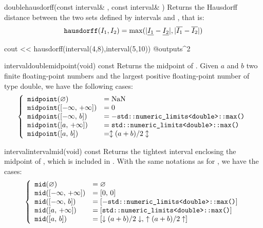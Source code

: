 \documentclass{manual}
\newcommand{\itv}[2]{\ensuremath{[#1,\,#2]}}
\newcommand{\roundDn}[1]{\ensuremath{\downarrow#1\downarrow}}
\newcommand{\roundUp}[1]{\ensuremath{\uparrow#1\uparrow}}
\newcommand{\roundNearest}[1]{\ensuremath{\updownarrow#1\updownarrow}}
\newcommand{\leftBound}[1]{\ensuremath{\underline{#1}}}
\newcommand{\rightBound}[1]{\ensuremath{\overline{#1}}}
\let\emptyset=\varnothing
\begin{document}
\begin{deffun}{double}{hausdorff}{(const interval\& , const interval\& )}
  Returns the Hausdorff distance between the two sets defined by intervals  and
  , that is:
\begin{equation*}
\code{hausdorff}(I_1,I_2)=\max(|\leftBound{I_1}-\leftBound{I_2}|,
                          |\rightBound{I_1}-\rightBound{I_2}|)
\end{equation*}
\begin{example}
cout << hausdorff(interval(4,8),interval(5,10))
@outputs^2~
\end{example}
\end{deffun}

\begin{defmethod}{interval}{double}{midpoint}{(void) const}
  Returns the midpoint of . Given $a$ and $b$ two finite
  floating-point numbers and  the largest positive
  floating-point number of type double, we have the following cases:
\begin{equation*}
\left\{\begin{array}{ll}
\code{midpoint}(\emptyset{})&=\text{NaN}\\
\code{midpoint}(\itv{-\infty}{+\infty})&=0\\
\code{midpoint}(\itv{-\infty}{b})&=-\code{std::numeric\_limits<double>::max()}\\
\code{midpoint}(\itv{a}{+\infty})&=\code{std::numeric\_limits<double>::max()}\\
\code{midpoint}(\itv{a}{b})&=\roundNearest{(a+b)/2} \\
\end{array}\right.
\end{equation*}
\end{defmethod}

\begin{defmethod}{interval}{interval}{mid}{(void) const}
  Returns the tightest interval enclosing the midpoint of , which is
  included in .
  With the same notations as for , we have the cases:
\begin{equation*}
\left\{\begin{array}{ll}
\code{mid}(\emptyset{})&=\emptyset{}\\
\code{mid}(\itv{-\infty}{+\infty})&=\itv{0}{0}\\
\code{mid}(\itv{-\infty}{b})&=[-\code{std::numeric\_limits<double>::max()}]\\
\code{mid}(\itv{a}{+\infty})&=[\code{std::numeric\_limits<double>::max()}]\\
\code{mid}(\itv{a}{b})&=\itv{\roundDn{(a+b)/2}}{\roundUp{(a+b)/2}}
\end{array}\right.
\end{equation*}
\end{defmethod}
\end{document}
